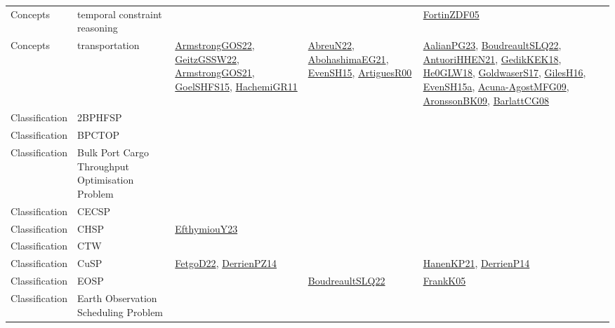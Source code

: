 {\begin{longtable}{lp{3cm}>{\raggedright}p{6cm}>{\raggedright}p{6cm}p{8cm}}
Concepts & temporal constraint reasoning &  &  & \href{papers/FortinZDF05.pdf}{FortinZDF05}\cite{FortinZDF05}\\
Concepts & transportation & \href{papers/ArmstrongGOS22.pdf}{ArmstrongGOS22}\cite{ArmstrongGOS22}, \href{papers/GeitzGSSW22.pdf}{GeitzGSSW22}\cite{GeitzGSSW22}, \href{papers/ArmstrongGOS21.pdf}{ArmstrongGOS21}\cite{ArmstrongGOS21}, \href{articles/GoelSHFS15.pdf}{GoelSHFS15}\cite{GoelSHFS15}, \href{articles/HachemiGR11.pdf}{HachemiGR11}\cite{HachemiGR11} & \href{articles/AbreuN22.pdf}{AbreuN22}\cite{AbreuN22}, \href{articles/AbohashimaEG21.pdf}{AbohashimaEG21}\cite{AbohashimaEG21}, \href{papers/EvenSH15.pdf}{EvenSH15}\cite{EvenSH15}, \href{articles/ArtiguesR00.pdf}{ArtiguesR00}\cite{ArtiguesR00} & \href{papers/AalianPG23.pdf}{AalianPG23}\cite{AalianPG23}, \href{papers/BoudreaultSLQ22.pdf}{BoudreaultSLQ22}\cite{BoudreaultSLQ22}, \href{papers/AntuoriHHEN21.pdf}{AntuoriHHEN21}\cite{AntuoriHHEN21}, \href{articles/GedikKEK18.pdf}{GedikKEK18}\cite{GedikKEK18}, \href{papers/He0GLW18.pdf}{He0GLW18}\cite{He0GLW18}, \href{papers/GoldwaserS17.pdf}{GoldwaserS17}\cite{GoldwaserS17}, \href{papers/GilesH16.pdf}{GilesH16}\cite{GilesH16}, \href{articles/EvenSH15a.pdf}{EvenSH15a}\cite{EvenSH15a}, \href{papers/Acuna-AgostMFG09.pdf}{Acuna-AgostMFG09}\cite{Acuna-AgostMFG09}, \href{papers/AronssonBK09.pdf}{AronssonBK09}\cite{AronssonBK09}, \href{papers/BarlattCG08.pdf}{BarlattCG08}\cite{BarlattCG08}\\
Classification & 2BPHFSP &  &  & \\
Classification & BPCTOP &  &  & \\
Classification & Bulk Port Cargo Throughput Optimisation Problem &  &  & \\
Classification & CECSP &  &  & \\
Classification & CHSP & \href{papers/EfthymiouY23.pdf}{EfthymiouY23}\cite{EfthymiouY23} &  & \\
Classification & CTW &  &  & \\
Classification & CuSP & \href{articles/FetgoD22.pdf}{FetgoD22}\cite{FetgoD22}, \href{papers/DerrienPZ14.pdf}{DerrienPZ14}\cite{DerrienPZ14} &  & \href{papers/HanenKP21.pdf}{HanenKP21}\cite{HanenKP21}, \href{papers/DerrienP14.pdf}{DerrienP14}\cite{DerrienP14}\\
Classification & EOSP &  & \href{papers/BoudreaultSLQ22.pdf}{BoudreaultSLQ22}\cite{BoudreaultSLQ22} & \href{papers/FrankK05.pdf}{FrankK05}\cite{FrankK05}\\
Classification & Earth Observation Scheduling Problem &  &  & \\

\end{longtable}}
